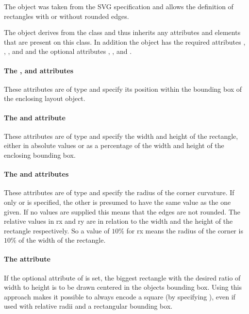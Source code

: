 The \RenderRectangle object was taken from the SVG specification and allows the 
definition of 
rectangles with or without rounded edges. 

The \RenderRectangle object derives from the \GraphicalPrimitiveTwoD
class and thus inherits any attributes and elements that are present on
this class.
In addition the \RenderRectangle object has the required attributes , 
, , and  and the optional attributes 
, ,  and .

\paragraph{The \fixttspace{}, \fixttspace{} and \fixttspace{}  attributes}

These attributes are of type
\RelAbsVector and specify its position within the 
bounding box of the enclosing layout object.

\paragraph{The \fixttspace{} and \fixttspace{} attribute}

These attributes are of type
\RelAbsVector and specify the width and height of the rectangle, 
either in absolute values or as a percentage of the width and height of the 
enclosing bounding box. 

\paragraph{The \fixttspace{} and \fixttspace{} attributes}

These attributes are of type
\RelAbsVector and specify the radius of the corner curvature. If only 
or  is specified, the other is presumed to have the same value as the 
one given. If no values are supplied this means that the edges are not rounded.
The relative values in rx and ry are in relation to the width and the height of
 the rectangle respectively. So a value of $10\%$ for rx means the radius of 
the corner is $10\%$ of the width of the rectangle. 


\paragraph{The \fixttspace{} attribute}
If the optional  attribute of  is set, the biggest 
rectangle with the desired ratio of width to height is to be drawn centered in the 
objects bounding box. Using this approach makes it possible to always encode a 
square (by specifying ), even if used with relative radii and a rectangular bounding box. 



